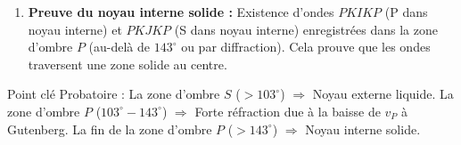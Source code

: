 \documentclass[11pt]{article}
\newcommand{\cle}[1]{{\popxbold\color{popdark}#1}}
\begin{document}
\begin{methode}
\begin{enumerate}
\begin{itemize}
        \textbf{Formule simplifiée souvent utilisée au lycée :} $\Delta_{S_{\text{limite}}} = 180^\circ - 2 \arcsin(R_c/R_T)$.
        On sait $\Delta_{S_{\text{limite}}} = 103^\circ$.
        $103 = 180 - 2 \arcsin(R_c/R_T) \Rightarrow \arcsin(R_c/R_T) = 38,5^\circ$.
        $R_c = R_T \times \sin(38,5^\circ) = 6371 \times 0,622 \approx 3960$ km.
        La valeur acceptée (modèle PREM) est $R_c = 3480$ km (profondeur $2891$ km $\approx$ \textbf{2900 km}). L'écart vient de l'hypothèse de manteau homogène (vitesse constante) dans ce calcul simplifié ; en réalité, le gradient de vitesse dans le manteau courbe les rayons.
    \end{itemize}
    \item \textbf{Preuve du noyau interne solide :} Existence d'ondes $PKIKP$ (P dans noyau interne) et $PKJKP$ (S dans noyau interne) enregistrées dans la zone d'ombre $P$ (au-delà de $143^\circ$ ou par diffraction). Cela prouve que les ondes traversent une zone solide au centre.
\end{enumerate}
\cle{Point clé Probatoire :} La zone d'ombre $S$ ($>103^\circ$) $\Rightarrow$ Noyau externe liquide. La zone d'ombre $P$ ($103^\circ - 143^\circ$) $\Rightarrow$ Forte réfraction due à la baisse de $v_P$ à Gutenberg. La fin de la zone d'ombre $P$ ($>143^\circ$) $\Rightarrow$ Noyau interne solide.
\end{methode}
\end{document}
